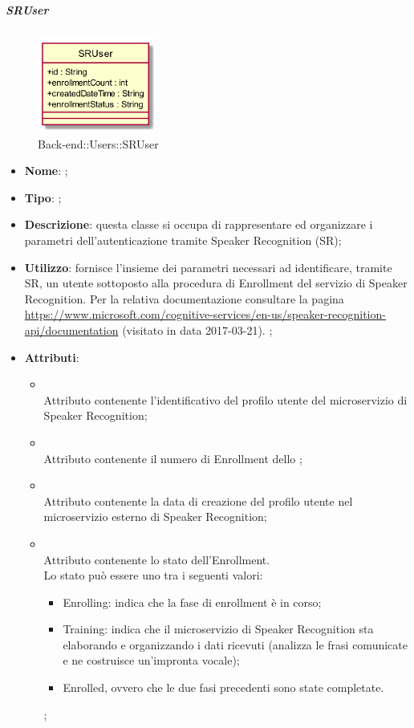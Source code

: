 \hypertarget{SRUser_label}{\subparagraph{SRUser}}
\begin{figure}[h]
	\centering
	\includegraphics[width=0.35\textwidth,height=\textheight,keepaspectratio]{images/ClassSRUser.png}
	\caption{Back-end::Users::SRUser}
\end{figure}
\begin{itemize}
	\item \textbf{Nome}: ;
	\item \textbf{Tipo}: ;
	\item \textbf{Descrizione}: questa classe si occupa di rappresentare ed organizzare i parametri dell'autenticazione tramite Speaker Recognition (SR);
	\item \textbf{Utilizzo}: fornisce l'insieme dei parametri necessari ad identificare, tramite SR, un utente sottoposto alla procedura di Enrollment del servizio di Speaker Recognition.
	Per la relativa documentazione consultare la pagina \url{https://www.microsoft.com/cognitive-services/en-us/speaker-recognition-api/documentation}  (visitato in data 2017-03-21).
	;
	\item \textbf{Attributi}:
	\begin{itemize}
		\item[]  \\
		Attributo contenente l'identificativo del profilo utente del microservizio di Speaker Recognition;
		\item[]  \\
		Attributo contenente il numero di Enrollment dello ;
		\item[]  \\
		Attributo contenente la data di creazione del profilo utente nel microservizio esterno di Speaker Recognition;
		\item[]  \\
		Attributo contenente lo stato dell'Enrollment.\\
		Lo stato può essere uno tra i seguenti valori:
		\begin{itemize} \item Enrolling: indica che la fase di enrollment è in corso; \item Training: indica che il microservizio di Speaker Recognition sta elaborando e organizzando i dati ricevuti (analizza le frasi comunicate e ne costruisce un'impronta vocale); \item Enrolled, ovvero che le due fasi precedenti sono state completate. \end{itemize};

\end{itemize}
\end{itemize}
